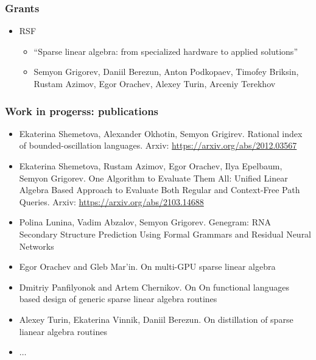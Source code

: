 \documentclass[xcolor=table]{beamer}
\begin{document}
\begin{frame}[fragile]

  \frametitle{Grants}
\begin{itemize}
      \item[\faTimes] RSF 
      \begin{itemize}
        \item ``Sparse linear algebra: from specialized hardware to applied solutions''
        \item Semyon Grigorev, Daniil Berezun, Anton Podkopaev, Timofey Briksin, Rustam Azimov, Egor Orachev, Alexey Turin, Arceniy Terekhov
      \end{itemize}
\end{itemize}
\end{frame}

\begin{frame}[fragile]

\frametitle{Work in progerss: publications}
\begin{itemize}
      \item[\faHourglassHalf] Ekaterina Shemetova, Alexander Okhotin, Semyon Grigirev. Rational index of bounded-oscillation languages. Arxiv: \url{https://arxiv.org/abs/2012.03567}
      
      \item[\faHourglassHalf] Ekaterina Shemetova, Rustam Azimov, Egor Orachev, Ilya Epelbaum, Semyon Grigorev. One Algorithm to Evaluate Them All: Unified Linear Algebra Based Approach to Evaluate Both Regular and Context-Free Path Queries. Arxiv: \url{https://arxiv.org/abs/2103.14688}
      \item[\faHourglassHalf] Polina Lunina, Vadim Abzalov, Semyon Grigorev. Genegram: RNA Secondary Structure       Prediction Using Formal Grammars and Residual Neural Networks
      \pause
      \item[\faGears] Egor Orachev and Gleb Mar'in. On multi-GPU sparse linear algebra
      \item[\faGears] Dmitriy Panfilyonok and Artem Chernikov. On On functional languages based design of generic sparse linear algebra routines 
      \item[\faGears] Alexey Turin, Ekaterina Vinnik, Daniil Berezun. On distillation of sparse lianear algebra routines
      \item[\faGears] $\ldots$
\end{itemize}
\end{frame}
\end{document}
